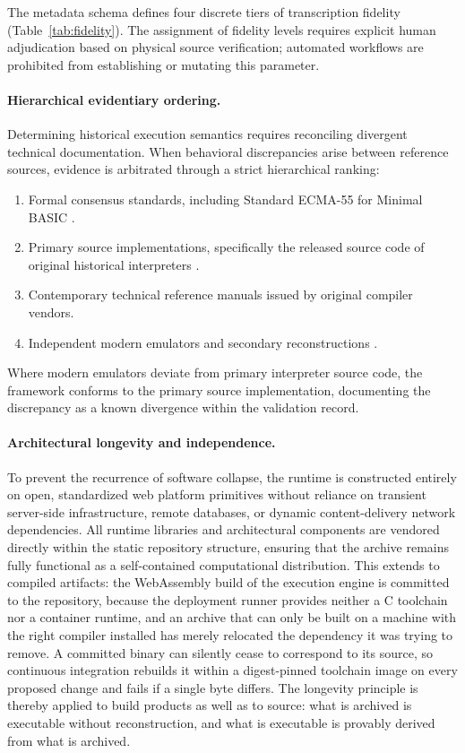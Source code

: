 \documentclass[11pt,a4paper]{article}
\begin{document}
The metadata schema defines four discrete tiers of transcription fidelity (Table~\ref{tab:fidelity}). The assignment of fidelity levels requires explicit human adjudication based on physical source verification; automated workflows are prohibited from establishing or mutating this parameter.

\paragraph{Hierarchical evidentiary ordering.} Determining historical execution semantics requires reconciling divergent technical documentation. When behavioral discrepancies arise between reference sources, evidence is arbitrated through a strict hierarchical ranking:
\begin{enumerate}
\item Formal consensus standards, including Standard ECMA-55 for Minimal BASIC \citep{ecma55}.
\item Primary source implementations, specifically the released source code of original historical interpreters \citep{gwbasic}.
\item Contemporary technical reference manuals issued by original compiler vendors.
\item Independent modern emulators and secondary reconstructions \citep{pcbasic}.
\end{enumerate}
Where modern emulators deviate from primary interpreter source code, the framework conforms to the primary source implementation, documenting the discrepancy as a known divergence within the validation record.

\paragraph{Architectural longevity and independence.} To prevent the recurrence of software collapse, the runtime is constructed entirely on open, standardized web platform primitives without reliance on transient server-side infrastructure, remote databases, or dynamic content-delivery network dependencies. All runtime libraries and architectural components are vendored directly within the static repository structure, ensuring that the archive remains fully functional as a self-contained computational distribution. This extends to compiled artifacts: the WebAssembly build of the execution engine is committed to the repository, because the deployment runner provides neither a C toolchain nor a container runtime, and an archive that can only be built on a machine with the right compiler installed has merely relocated the dependency it was trying to remove. A committed binary can silently cease to correspond to its source, so continuous integration rebuilds it within a digest-pinned toolchain image on every proposed change and fails if a single byte differs. The longevity principle is thereby applied to build products as well as to source: what is archived is executable without reconstruction, and what is executable is provably derived from what is archived.
\end{document}
